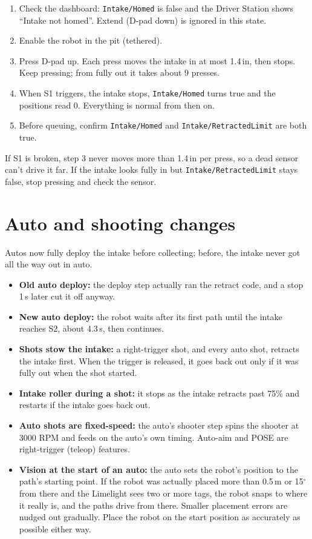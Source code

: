 \documentclass[11pt]{article}
\newcommand{\dash}[1]{\texttt{#1}}
\begin{document}
\begin{enumerate}
  \item Check the dashboard: \dash{Intake/Homed} is false and the Driver Station shows ``Intake
    not homed''. Extend (D-pad down) is ignored in this state.
  \item Enable the robot in the pit (tethered).
  \item Press D-pad up. Each press moves the intake in at most 1.4\,in, then stops. Keep
    pressing; from fully out it takes about 9 presses.
  \item When S1 triggers, the intake stops, \dash{Intake/Homed} turns true and the positions read
    0. Everything is normal from then on.
  \item Before queuing, confirm \dash{Intake/Homed} and \dash{Intake/RetractedLimit} are both
    true.
\end{enumerate}

If S1 is broken, step 3 never moves more than 1.4\,in per press, so a dead sensor can't drive it
far. If the intake looks fully in but \dash{Intake/RetractedLimit} stays false, stop pressing and
check the sensor.

\section*{Auto and shooting changes}

Autos now fully deploy the intake before collecting; before, the intake never got all the way
out in auto.

\begin{itemize}
  \item \textbf{Old auto deploy:} the deploy step actually ran the retract code, and a stop 1\,s
    later cut it off anyway.
  \item \textbf{New auto deploy:} the robot waits after its first path until the intake reaches
    S2, about 4.3\,s, then continues.
  \item \textbf{Shots stow the intake:} a right-trigger shot, and every auto shot, retracts the
    intake first. When the trigger is released, it goes back out only if it was fully out when
    the shot started.
  \item \textbf{Intake roller during a shot:} it stops as the intake retracts past 75\% and
    restarts if the intake goes back out.
  \item \textbf{Auto shots are fixed-speed:} the auto's shooter step spins the shooter at 3000 RPM
    and feeds on the auto's own timing. Auto-aim and POSE are right-trigger (teleop) features.
  \item \textbf{Vision at the start of an auto:} the auto sets the robot's position to the path's
    starting point. If the robot was actually placed more than 0.5\,m or 15$^\circ$ from there and
    the Limelight sees two or more tags, the robot snaps to where it really is, and the paths drive
    from there. Smaller placement errors are nudged out gradually. Place the robot on the start
    position as accurately as possible either way.
\end{itemize}
\end{document}

